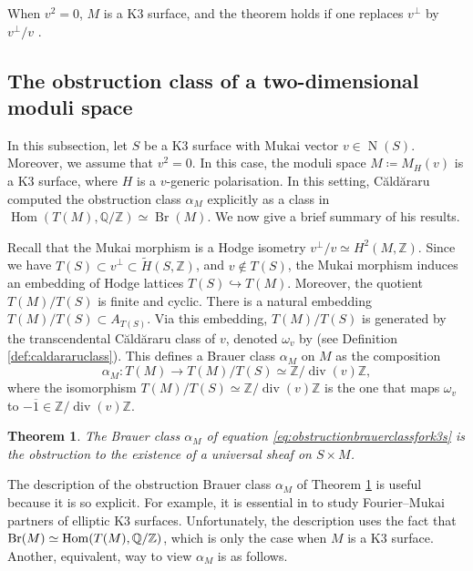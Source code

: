\documentclass[11pt,twoside]{amsart}
\numberwithin{equation}{section}
\newtheorem{theorem}[dummy]{Theorem}
\theoremstyle{definition}
\theoremstyle{plain}
\newcommand{\Z}{\ensuremath{\mathbb{Z}}}
\newcommand{\Q}{\ensuremath{\mathbb{Q}}}
\def\Br{\operatorname{Br}}
\def\ol{\overline}
\def\N{\operatorname{N}}
\def\dv{\operatorname{div}}
\begin{document}
When $v^2=0$, $M$ is a K3 surface, and the theorem holds if one replaces $v^\perp$ by $v^\perp/v$ \cite[Theorem 1.5]{Muk87}.

\subsection{The obstruction class of a two-dimensional moduli space}
In this subsection, let $S$ be a K3 surface with Mukai vector $v\in \N(S)$. Moreover, we assume that $v^2 = 0$. In this case, the moduli space $M\coloneqq M_H(v)$ is a K3 surface, where $H$ is a $v$-generic polarisation. In this setting, C\u ald\u araru computed the obstruction class $\alpha_M$ explicitly as a class in $\operatorname{Hom}(T(M),\Q/\Z) \simeq \Br(M)$. We now give a brief summary of his results.

Recall that the Mukai morphism is a Hodge isometry $v^\perp/v\simeq H^2(M,\Z)$. Since we have $T(S)\subset v^\perp\subset \tilde{H}(S,\Z)$, and $v\notin T(S)$, the Mukai morphism induces an embedding of Hodge lattices $T(S)\hookrightarrow T(M)$. Moreover, the quotient $T(M)/T(S)$ is finite and cyclic. 
There is a natural embedding $T(M)/T(S)\subset A_{T(S)}$. Via this embedding, $T(M)/T(S)$ is generated by the transcendental C\u ald\u araru class of $v$, denoted $\omega_v$ by \cite[Proposition 6.4]{Muk87} (see Definition \ref{def:caldararuclass}). This defines a Brauer class $\alpha_M$ on $M$ as the composition 
\begin{equation}\label{eq:obstructionbrauerclassfork3s}
    \alpha_M:T(M)\to T(M)/T(S)\simeq \Z/\dv(v)\Z,
\end{equation}
where the isomorphism $T(M)/T(S)\simeq \Z/\dv(v)\Z$ is the one that maps $\omega_v$ to $-\ol{1}\in \Z/\dv(v)\Z$. 

\begin{theorem}\cite{Cal00} \label{thm:obstructionsfork3s}
    The Brauer class $\alpha_M$ of equation \eqref{eq:obstructionbrauerclassfork3s} is the obstruction to the existence of a universal sheaf on $S\times M$. 
\end{theorem}

The description of the obstruction Brauer class $\alpha_M$ of Theorem \ref{thm:obstructionsfork3s} is useful because it is so explicit. For example, it is essential in \cite{MS24} to study Fourier--Mukai partners of elliptic K3 surfaces. Unfortunately, the description uses the fact that $\Br(M)\simeq \Hom(T(M),\Q/\Z)$, which is only the case when $M$ is a K3 surface. Another, equivalent, way to view $\alpha_M$ is as follows.
\end{document}
